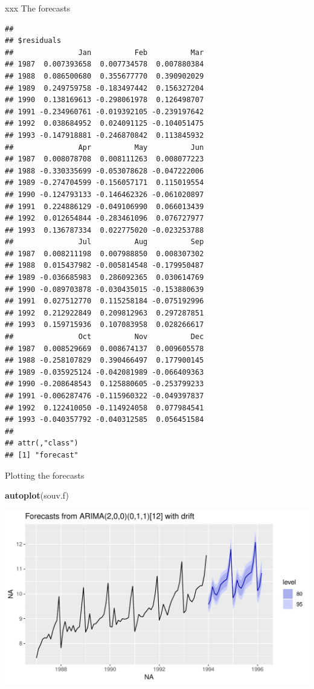 \documentclass[ignorenonframetext,]{beamer}
\newenvironment{Shaded}{\begin{snugshade}}{\end{snugshade}}
\newcommand{\KeywordTok}[1]{\textcolor[rgb]{0.13,0.29,0.53}{\textbf{#1}}}
\newcommand{\NormalTok}[1]{#1}
\begin{document}
\begin{frame}[fragile]{xxx The forecasts}
\begin{verbatim}
## 
## $residuals
##               Jan          Feb          Mar
## 1987  0.007393658  0.007734578  0.007880384
## 1988  0.086500680  0.355677770  0.390902029
## 1989  0.249759758 -0.183497442  0.156327204
## 1990  0.138169613 -0.298061978  0.126498707
## 1991 -0.234960761 -0.019392105 -0.239197642
## 1992  0.038684952  0.024091125 -0.104051475
## 1993 -0.147918881 -0.246870842  0.113845932
##               Apr          May          Jun
## 1987  0.008078708  0.008111263  0.008077223
## 1988 -0.330335699 -0.053078628 -0.047222006
## 1989 -0.274704599 -0.156057171  0.115019554
## 1990 -0.124793133 -0.146462326 -0.061020897
## 1991  0.224886129 -0.049106990  0.066013439
## 1992  0.012654844 -0.283461096  0.076727977
## 1993  0.136787334  0.022775020 -0.023253788
##               Jul          Aug          Sep
## 1987  0.008211198  0.007988850  0.008307302
## 1988  0.015437982 -0.005814548 -0.179950487
## 1989 -0.036685983  0.286092365  0.030614769
## 1990 -0.089703878 -0.030435015 -0.153880639
## 1991  0.027512770  0.115258184 -0.075192996
## 1992  0.212922849  0.209812963  0.297287851
## 1993  0.159715936  0.107083958  0.028266617
##               Oct          Nov          Dec
## 1987  0.008529669  0.008674137  0.009605578
## 1988 -0.258107829  0.390466497  0.177900145
## 1989 -0.035925124 -0.042081989 -0.066409363
## 1990 -0.208648543  0.125880605 -0.253799233
## 1991 -0.006287476 -0.115960322 -0.049397837
## 1992  0.122410050 -0.114924058  0.077984541
## 1993 -0.040357792 -0.040312585  0.056451584
## 
## attr(,"class")
## [1] "forecast"
\end{verbatim}

\normalsize

\end{frame}

\begin{frame}[fragile]{Plotting the forecasts}
\protect\hypertarget{plotting-the-forecasts-1}{}

\begin{Shaded}
\begin{Highlighting}[]
\KeywordTok{autoplot}\NormalTok{(souv.f)}
\end{Highlighting}
\end{Shaded}

\includegraphics{figure/unnamed-chunk-66-1.pdf}

\end{frame}
\end{document}
